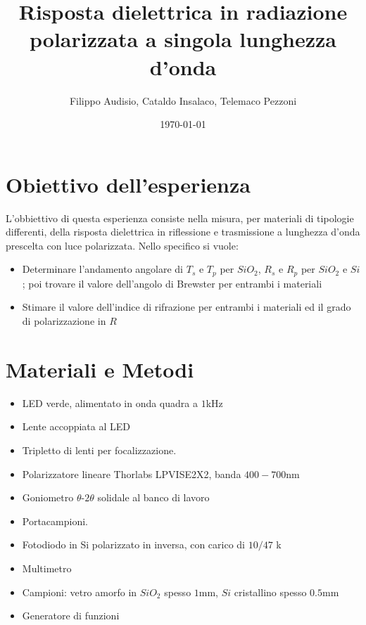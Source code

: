 \documentclass[a4paper,12pt]{article}
\title{\textbf{Risposta dielettrica in radiazione polarizzata a singola lunghezza d'onda}}
\author{Filippo Audisio, Cataldo Insalaco, Telemaco Pezzoni}
\date{\today}
\begin{document}
    \maketitle

    \section{Obiettivo dell'esperienza}
    
    L'obbiettivo di questa esperienza consiste nella misura, per materiali di tipologie differenti, della risposta dielettrica in riflessione e trasmissione a lunghezza d'onda prescelta con luce polarizzata. Nello specifico si vuole:
    \begin{itemize}
        \item Determinare l'andamento angolare di $T_s$ e $T_p$ per $SiO_2$, $R_s$ e $R_p$ per $SiO_2$ e $Si$; poi trovare il valore dell'angolo di Brewster per entrambi i materiali
        \item Stimare il valore dell'indice di rifrazione per entrambi i materiali ed il grado di polarizzazione in $R$
    \end{itemize}
    \section{Materiali e Metodi}

    \begin{itemize}
    \item LED verde, alimentato in onda quadra a $1$\unit{kHz}
    \item Lente accoppiata al LED
    \item Tripletto di lenti per focalizzazione.
    \item Polarizzatore lineare Thorlabs LPVISE2X2, banda $400-700$\unit{nm}
    \item Goniometro $\theta$-$2\theta$ solidale al banco di lavoro
    \item Portacampioni.
    \item Fotodiodo in Si polarizzato in inversa, con carico di $10/47$ \unit{k\Omega}
    \item Multimetro
    \item Campioni: vetro amorfo in $SiO_2$ spesso $1$\unit{mm}, $Si$ cristallino spesso $0.5$\unit{mm}
    \item Generatore di funzioni
    \end{itemize}
 
\end{document}
